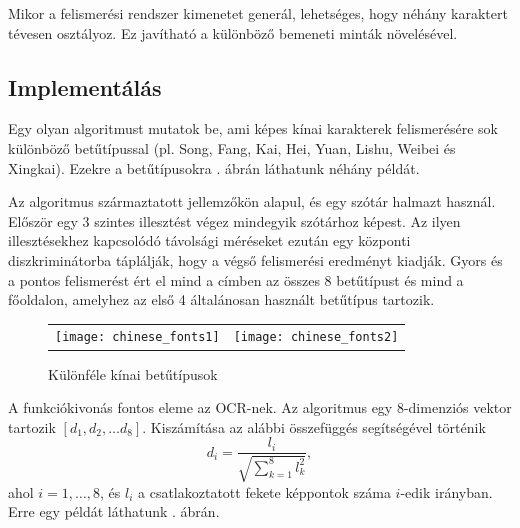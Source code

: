 Mikor a felismerési rendszer kimenetet generál, lehetséges, hogy néhány karaktert tévesen osztályoz. Ez javítható a különböző bemeneti minták növelésével.

\subsection{Implementálás}

Egy olyan algoritmust \cite{wu2002recognition} mutatok be, ami képes kínai karakterek felismerésére sok különböző betűtípussal (pl. Song, Fang, Kai, Hei, Yuan, Lishu, Weibei és Xingkai). Ezekre a betűtípusokra . ábrán láthatunk néhány példát.

Az algoritmus származtatott jellemzőkön alapul, és egy szótár halmazt használ. Először egy 3 szintes illesztést végez mindegyik szótárhoz képest. Az ilyen illesztésekhez kapcsolódó távolsági méréseket ezután egy központi diszkriminátorba táplálják, hogy a végső felismerési eredményt kiadják. Gyors és a pontos felismerést ért el mind a címben az összes 8 betűtípust és mind a főoldalon, amelyhez az első 4 általánosan használt betűtípus tartozik.

\begin{figure}[h]
\centering
\begin{tabular}{ c c }
\texttt{[image: chinese\_fonts1]} & \texttt{[image: chinese\_fonts2]}
\end{tabular}
\caption{Különféle kínai betűtípusok}
\label{fig:chinese_fonts}
\end{figure}

A funkciókivonás \cite{wu2002recognition} fontos eleme az OCR-nek. Az algoritmus egy 8-dimenziós vektor tartozik $[d_1, d_2, \ldots d_8]$. Kiszámítása az alábbi összefüggés segítségével történik
$$
d_i = \dfrac{l_i}{\sqrt{\displaystyle \sum_{k=1}^8 l_k^2}},
$$
ahol $i = 1, \ldots, 8$, és $l_i$ a csatlakoztatott fekete képpontok száma $i$-edik irányban. Erre egy példát láthatunk . ábrán.

